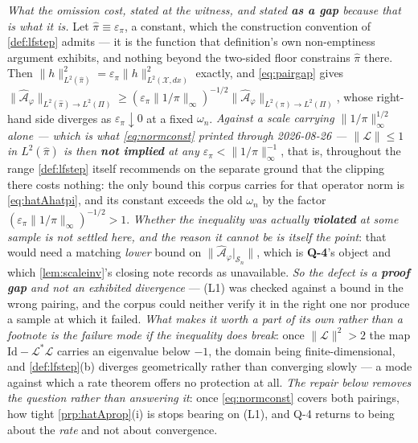\begin{remark}
\emph{What the omission cost, stated at the witness, and stated \textbf{as a gap} because that is what
it is.} Let $\hat\pi\equiv\varepsilon_\pi$, a constant, which the construction convention of
\cref{def:lfstep} admits --- it is the function that definition's own non-emptiness argument exhibits,
and nothing beyond the two-sided floor constrains $\hat\pi$ there. Then
$\|h\|^{2}_{L^{2}(\hat\pi)}=\varepsilon_\pi\|h\|^{2}_{L^{2}(\mathcal X,dx)}$ exactly, and
\eqref{eq:pairgap} gives
$\|\hat{\mathcal A}_\varphi\|_{L^{2}(\hat\pi)\to L^{2}(\Pi)}
\ge(\varepsilon_\pi\|1/\pi\|_\infty)^{-1/2}\|\hat{\mathcal A}_\varphi\|_{L^{2}(\pi)\to L^{2}(\Pi)}$,
whose right-hand side diverges as $\varepsilon_\pi\downarrow0$ at a fixed $\omega_n$. \emph{Against a
scale carrying $\|1/\pi\|_\infty^{1/2}$ alone --- which is what \eqref{eq:normconst} printed through
2026-08-26 --- $\|\mathcal L\|\le1$ in $L^{2}(\hat\pi)$ is then \textbf{not implied} at any
$\varepsilon_\pi<\|1/\pi\|_\infty^{-1}$}, that is, throughout the range \cref{def:lfstep} itself
recommends on the separate ground that the clipping there costs nothing: the only bound this corpus
carries for that operator norm is \eqref{eq:hatAhatpi}, and its constant exceeds the old $\omega_n$ by
the factor $(\varepsilon_\pi\|1/\pi\|_\infty)^{-1/2}>1$.
\emph{Whether the inequality was actually \textbf{violated} at some sample is not settled here, and the
reason it cannot be is itself the point}: that would need a matching \emph{lower} bound on
$\|\hat{\mathcal A}_\varphi\vert_{\mathcal S_n}\|$, which is \textbf{Q-4}'s object and which
\cref{lem:scaleinv}'s closing note records as unavailable. \emph{So the defect is a \textbf{proof gap}
and not an exhibited divergence} --- \textup{(L1)} was checked against a bound in the wrong pairing, and
the corpus could neither verify it in the right one nor produce a sample at which it failed. \emph{What
makes it worth a part of its own rather than a footnote is the failure mode if the inequality does
break}: once $\|\mathcal L\|^{2}>2$ the map $\mathrm{Id}-\mathcal L^{\ast}\mathcal L$ carries an eigenvalue below
$-1$, the domain being finite-dimensional, and \cref{def:lfstep}\textup{(b)} diverges geometrically
rather than converging slowly --- a mode against which a rate theorem offers no protection at all.
\emph{The repair below removes the question rather than answering it}: once \eqref{eq:normconst} covers
both pairings, how tight \cref{prp:hatAprop}\textup{(i)} is stops bearing on \textup{(L1)}, and Q-4
returns to being about the \emph{rate} and not about convergence.


\end{remark}

